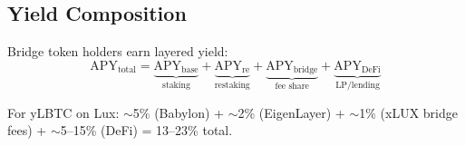 \subsection{Yield Composition}

Bridge token holders earn layered yield:
\begin{equation}
  \text{APY}_{\text{total}} = \underbrace{\text{APY}_{\text{base}}}_{\text{staking}} + \underbrace{\text{APY}_{\text{re}}}_{\text{restaking}} + \underbrace{\text{APY}_{\text{bridge}}}_{\text{fee share}} + \underbrace{\text{APY}_{\text{DeFi}}}_{\text{LP/lending}}
\end{equation}

For yLBTC on Lux: $\sim$5\% (Babylon) + $\sim$2\% (EigenLayer) + $\sim$1\% (xLUX bridge fees) + $\sim$5--15\% (DeFi) = 13--23\% total.

